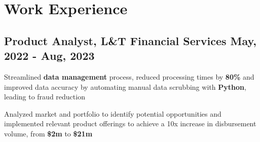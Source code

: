 \documentclass[]{resume}
\begin{document}
\section{Work Experience} 
\hrulefill 

\subsection{Product Analyst, L\&T Financial Services \hfill \normalfont May, 2022 - Aug, 2023}

\begin{adjustwidth}{0.5cm}{0cm}
    
    



    \pt Streamlined \textbf{data management} process, reduced processing times by \textbf{80\%} and improved data accuracy by automating manual data scrubbing with \textbf{Python}, leading to fraud reduction
        


    \pt Analyzed market and portfolio to identify potential opportunities and implemented relevant product offerings to achieve a 10x increase in disbursement volume, from \textbf{\$2m} to \textbf{\$21m}

    


\end{adjustwidth}
\end{document}
